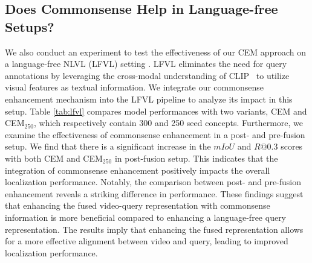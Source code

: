 \subsection{Does Commonsense Help in Language-free Setups?}
\label{ablation:lfvl}

We also conduct an experiment to test the effectiveness of our CEM approach on a language-free NLVL (LFVL) setting \cite{kim2023language}. LFVL eliminates the need for query annotations by leveraging the cross-modal understanding of CLIP~\cite{radford2021learning} to utilize visual features as textual information. We integrate our commonsense enhancement mechanism into the LFVL pipeline to analyze its impact in this setup. Table \ref{tab:lfvl} compares model performances with two variants, CEM and CEM$_{250}$, which respectively contain 300 and 250 seed concepts. Furthermore, we examine the effectiveness of commonsense enhancement in a post- and pre-fusion setup.
We find that there is a significant increase in the $mIoU$ and $R@0.3$ scores with both CEM and CEM$_{250}$ in post-fusion setup. 
This indicates that the integration of commonsense enhancement positively impacts the overall localization performance. Notably, the comparison between post- and pre-fusion enhancement reveals a striking difference in performance. These findings suggest that enhancing the fused video-query representation with commonsense information is more beneficial compared to enhancing a language-free query representation. The results imply that enhancing the fused representation allows for a more effective alignment between video and query, leading to improved localization performance.